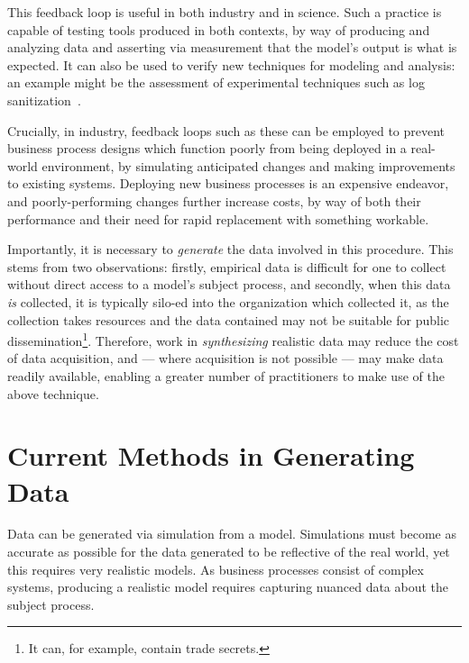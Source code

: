 \documentclass[12pt]{llncs}  %
\begin{document}
This feedback loop is useful in both industry and in science. Such a practice is
capable of testing tools produced in both contexts, by way of producing and
analyzing data and asserting via measurement that the model's output is what is
expected. It can also be used to verify new techniques for modeling and
analysis: an example might be the assessment of experimental techniques such as
log sanitization~\citep{cheng2015process}.
\par


Crucially, in industry, feedback loops such as these can be employed to prevent
business process designs which function poorly from being deployed in a
real-world environment, by simulating anticipated changes and making
improvements to existing systems. Deploying new business processes is an
expensive endeavor, and poorly-performing changes further increase costs, by way
of both their performance and their need for rapid replacement with something
workable.
\par

Importantly, it is necessary to \emph{generate} the data involved in this
procedure. This stems from two observations: firstly, empirical data is
difficult for one to collect without direct access to a model's subject process,
and secondly, when this data \emph{is} collected, it is typically silo-ed into
the organization which collected it, as the collection takes resources and the
data contained may not be suitable for public dissemination\footnote{It can, for
  example, contain trade secrets.}. Therefore, work in \emph{synthesizing}
realistic data may reduce the cost of data acquisition, and --- where acquisition is
not possible --- may make data readily available, enabling a greater number of
practitioners to make use of the above technique.
\par



\section{Current Methods in Generating Data}
Data can be generated via simulation from a model. Simulations must become as
accurate as possible for the data generated to be reflective of the real world,
yet this requires very realistic models. As business processes consist of
complex systems, producing a realistic model requires capturing nuanced data
about the subject process.
\par
\end{document}
